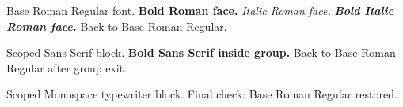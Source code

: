 \documentclass{article}
\begin{document}
Base Roman Regular font.
\textbf{Bold Roman face.}
\textit{Italic Roman face.}
\textbf{\textit{Bold Italic Roman face.}}
Back to Base Roman Regular.

{\sffamily
Scoped Sans Serif block.
\textbf{Bold Sans Serif inside group.}
}
Back to Base Roman Regular after group exit.

{\ttfamily
Scoped Monospace typewriter block.
}
Final check: Base Roman Regular restored.
\end{document}
